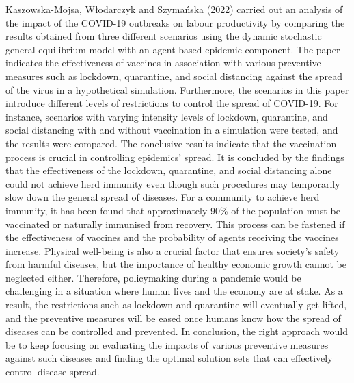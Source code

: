 \documentclass[smallextended]{svjour3}       %
\begin{document}
Kaszowska-Mojsa, Włodarczyk and Szymańska (2022) carried out an analysis of the impact of
the COVID-19 outbreaks on labour productivity by comparing the results obtained from three
different scenarios using the dynamic stochastic general equilibrium model with an agent-based
epidemic component. The paper indicates the effectiveness of vaccines in association with
various preventive measures such as lockdown, quarantine, and social distancing against the
spread of the virus in a hypothetical simulation. Furthermore, the scenarios in this paper
introduce different levels of restrictions to control the spread of COVID-19. For instance,
scenarios with varying intensity levels of lockdown, quarantine, and social distancing with and
without vaccination in a simulation were tested, and the results were compared. The conclusive
results indicate that the vaccination process is crucial in controlling epidemics’ spread. It is
concluded by the findings that the effectiveness of the lockdown, quarantine, and social
distancing alone could not achieve herd immunity even though such procedures may
temporarily slow down the general spread of diseases. For a community to achieve herd
immunity, it has been found that approximately 90\% of the population must be vaccinated or naturally immunised from recovery. This process can be fastened if the effectiveness of
vaccines and the probability of agents receiving the vaccines increase. Physical well-being is
also a crucial factor that ensures society’s safety from harmful diseases, but the importance of
healthy economic growth cannot be neglected either. Therefore, policymaking during a
pandemic would be challenging in a situation where human lives and the economy are at stake.
As a result, the restrictions such as lockdown and quarantine will eventually get lifted, and the
preventive measures will be eased once humans know how the spread of diseases can be
controlled and prevented. In conclusion, the right approach would be to keep focusing on
evaluating the impacts of various preventive measures against such diseases and finding the
optimal solution sets that can effectively control disease spread.
\end{document}
